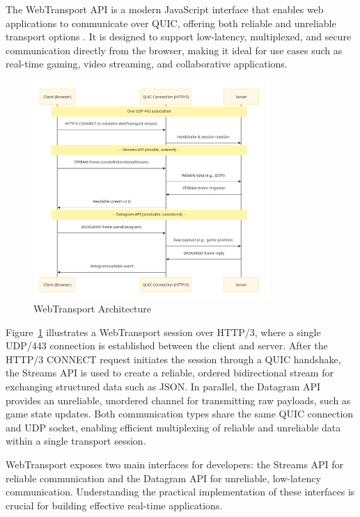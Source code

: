 The WebTransport API is a modern JavaScript interface that enables web applications to communicate over QUIC, offering both reliable and unreliable transport options \cite{webtransport-mdn}. It is designed to support low-latency, multiplexed, and secure communication directly from the browser, making it ideal for use cases such as real-time gaming, video streaming, and collaborative applications.


\begin{figure}[H]
\centering
\includegraphics[width=0.8\textwidth]{SOA/webtransport_architecture.png}
\caption{WebTransport Architecture}
\label{fig:webtransport_architecture}
\end{figure}

Figure~\ref{fig:webtransport_architecture} illustrates a WebTransport session over HTTP/3, where a single UDP/443 connection is established between the client and server. After the HTTP/3 CONNECT request initiates the session through a QUIC handshake, the Streams API is used to create a reliable, ordered bidirectional stream for exchanging structured data such as JSON. In parallel, the Datagram API provides an unreliable, unordered channel for transmitting raw payloads, such as game state updates. Both communication types share the same QUIC connection and UDP socket, enabling efficient multiplexing of reliable and unreliable data within a single transport session.

WebTransport exposes two main interfaces for developers: the Streams API for reliable communication and the Datagram API for unreliable, low-latency communication. Understanding the practical implementation of these interfaces is crucial for building effective real-time applications.

